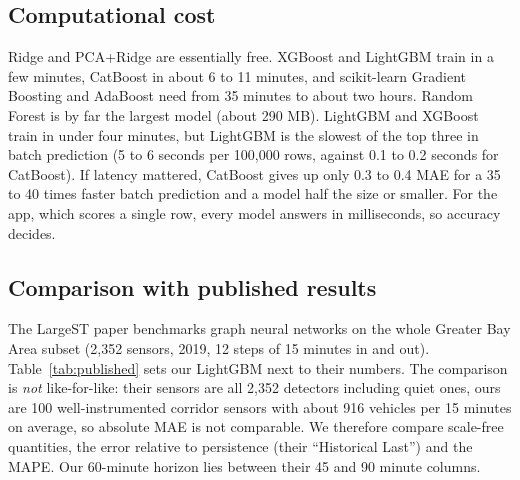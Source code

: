 \documentclass[11pt,a4paper]{article}
\begin{document}
\subsection{Computational cost}\label{sec:eff}
\begin{table}[H]\centering\small

\caption{Fit time on training plus validation rows (1.34 million rows, CPU), prediction time per 100{,}000 rows and model size. Left block: 15 minutes, right block: 60 minutes.}\label{tab:cost}
\end{table}
Ridge and PCA+Ridge are essentially free. XGBoost and LightGBM train in a few minutes, CatBoost in about 6 to 11 minutes, and scikit-learn Gradient Boosting and AdaBoost need from 35 minutes to about two hours. Random Forest is by far the largest model (about 290 MB).
LightGBM and XGBoost train in under four minutes, but LightGBM is the slowest of the top three in batch prediction (5 to 6 seconds per 100{,}000 rows, against 0.1 to 0.2 seconds for CatBoost). If latency mattered, CatBoost gives up only 0.3 to 0.4 MAE for a 35 to 40 times faster batch prediction and a model half the size or smaller. For the app, which
scores a single row, every model answers in milliseconds, so accuracy decides.

\subsection{Comparison with published results}
The LargeST paper \cite{largest} benchmarks graph neural networks on the whole Greater Bay Area subset (2{,}352 sensors, 2019, 12 steps of 15 minutes in and out). Table~\ref{tab:published} sets our LightGBM next to their numbers. The comparison is \emph{not} like-for-like: their sensors are all
2{,}352 detectors including quiet ones, ours are 100 well-instrumented corridor sensors with about 916 vehicles per 15 minutes on average, so absolute MAE is not comparable. We therefore compare scale-free quantities, the error relative to persistence (their ``Historical Last'') and the MAPE.
Our 60-minute horizon lies between their 45 and 90 minute columns.

\begin{table}[H]\centering\small

\caption{LargeST GBA results (Table 2 of \cite{largest}) and ours. ``/ persist.'' divides the error by the error of persistence at the same horizon. Our MAPE excludes rows whose true flow is zero; their treatment of zeros is not stated. The graph models are DCRNN \cite{dcrnn}, Graph WaveNet \cite{gwnet} and D2STGNN \cite{d2stgnn}; LSTM is \cite{lstm}.}\label{tab:published}
\end{table}
\end{document}

